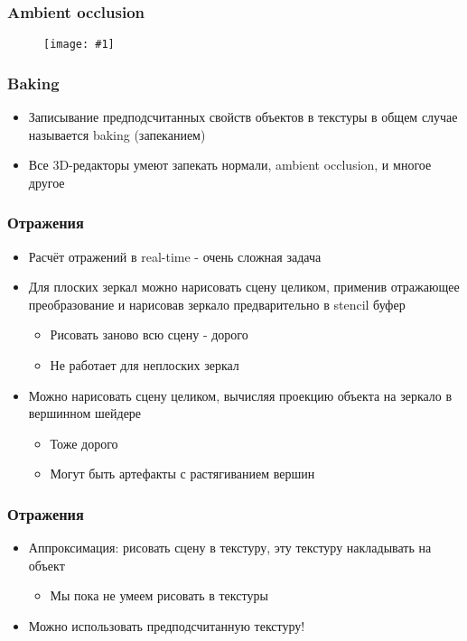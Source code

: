 \documentclass{beamer}
\newcommand{\slideimage}[1]{
  \begin{figure}
    \begin{adjustbox}{width=\textwidth, totalheight=\textheight-2\baselineskip-2\baselineskip,keepaspectratio}
      \texttt{[image: \#1]}
    \end{adjustbox}
  \end{figure}
}
\begin{document}
\begin{frame}[fragile]
\frametitle{Ambient occlusion}
\slideimage{baked-ao.png}
\end{frame}

\begin{frame}[fragile]
\frametitle{Baking}
\begin{itemize}
\item Записывание предподсчитанных свойств объектов в текстуры в общем случае называется baking (запеканием)
\pause
\item Все 3D-редакторы умеют запекать нормали, ambient occlusion, и многое другое
\end{itemize}
\end{frame}

\begin{frame}[fragile]
\frametitle{Отражения}
\begin{itemize}
\item Расчёт отражений в real-time - очень сложная задача
\pause
\item Для плоских зеркал можно нарисовать сцену целиком, применив отражающее преобразование и нарисовав зеркало предварительно в stencil буфер
\pause
\begin{itemize}
\item Рисовать заново всю сцену - дорого
\item Не работает для неплоских зеркал
\end{itemize}
\pause
\item Можно нарисовать сцену целиком, вычисляя проекцию объекта на зеркало в вершинном шейдере
\begin{itemize}
\item Тоже дорого
\item Могут быть артефакты с растягиванием вершин
\end{itemize}
\end{itemize}
\end{frame}

\begin{frame}[fragile]
\frametitle{Отражения}
\begin{itemize}
\item Аппроксимация: рисовать сцену в текстуру, эту текстуру накладывать на объект
\pause
\begin{itemize}
\item Мы пока не умеем рисовать в текстуры
\end{itemize}
\pause
\item Можно использовать предподсчитанную текстуру!
\end{itemize}
\end{frame}
\end{document}
